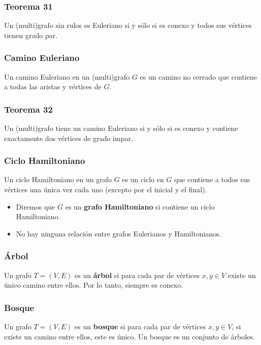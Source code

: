 \begin{multicols}{2}
    \subsubsection*{Teorema 31}
    Un (multi)grafo sin rulos es Euleriano si y sólo si es conexo y todos sus vértices tienen grado par.
    
    \subsubsection*{Camino Euleriano}
    Un camino Euleriano en un (multi)grafo $G$ es un camino no cerrado que contiene a todas las aristas y vértices de $G$.
    
    \subsubsection*{Teorema 32}
    Un (multi)grafo tiene un camino Euleriano si y sólo si es conexo y contiene exactamente dos vértices de grado impar.
    
    \subsubsection*{Ciclo Hamiltoniano}
    Un ciclo Hamiltoniano en un grafo $G$ es un ciclo en $G$ que contiene a todos sus vértices una única vez cada uno (excepto por el inicial y el final).
    \begin{itemize}
        \item Diremos que $G$ es un \textbf{grafo Hamiltoniano} si contiene un ciclo Hamiltoniano.
        \item No hay ninguna relación entre grafos Eulerianos y Hamiltonianos.
    \end{itemize}
    
    \subsubsection*{Árbol}
    Un grafo $T = (V, E)$ es un \textbf{árbol} si para cada par de vértices $x,y \in V$ existe un único camino entre ellos. Por lo tanto, siempre es conexo.
    
    \subsubsection*{Bosque}
    Un grafo $T = (V, E)$ es un \textbf{bosque} si para cada par de vértices $x,y \in V$, si existe un camino entre ellos, este es único. Un bosque es un conjunto de árboles.
    

\end{multicols}
